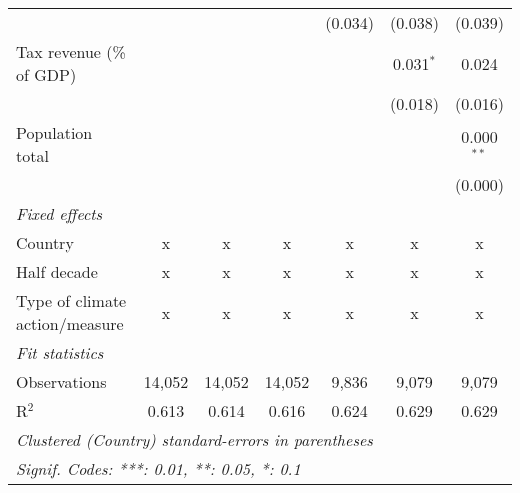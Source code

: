 \begin{tabular}{lcccccc}
                                                     &         &                &                & (0.034)        & (0.038)        & (0.039)\\   
   Tax revenue (\% of GDP)                           &         &                &                &                & 0.031$^{*}$    & 0.024\\   
                                                     &         &                &                &                & (0.018)        & (0.016)\\   
   Population total                                  &         &                &                &                &                & 0.000$^{**}$\\   
                                                     &         &                &                &                &                & (0.000)\\   
   \emph{Fixed effects}\\
   Country                                           & x       & x              & x              & x              & x              & x\\  
   Half decade                                       & x       & x              & x              & x              & x              & x\\  
   Type of climate action/measure                    & x       & x              & x              & x              & x              & x\\  
   \midrule \emph{Fit statistics}\\
   Observations                                      & 14,052  & 14,052         & 14,052         & 9,836          & 9,079          & 9,079\\  
   R$^2$                                             & 0.613   & 0.614          & 0.616          & 0.624          & 0.629          & 0.629\\  
   \midrule
   \multicolumn{7}{l}{\emph{Clustered (Country) standard-errors in parentheses}}\\
   \multicolumn{7}{l}{\emph{Signif. Codes: ***: 0.01, **: 0.05, *: 0.1}}\\
\end{tabular}
\par\endgroup


